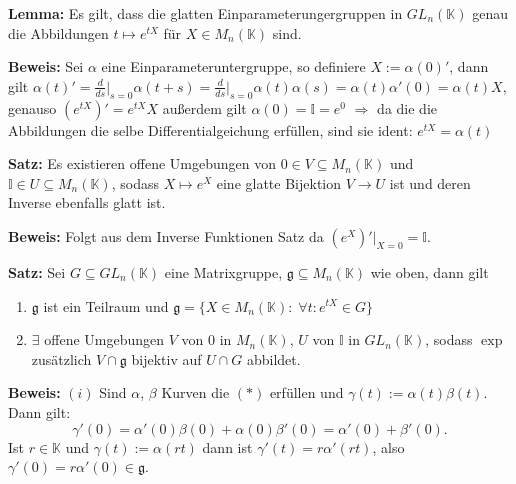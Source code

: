 \documentclass[11pt]{beamer}
\begin{document}
\begin{frame}
	\textbf{Lemma:}
	Es gilt, dass die glatten Einparameterungergruppen in $GL_n(\mathbb{K})$ genau die Abbildungen $t\mapsto e^{tX}$ für $X\in M_n(\mathbb{K})$ sind. \\[1em] \pause

	\textbf{Beweis:}
	Sei $\alpha$ eine Einparameteruntergruppe, so definiere $X:=\alpha(0)'$, \pause
	dann gilt $\alpha(t)' = \frac{d}{ds}\Big\vert_{s=0}\alpha(t+s) = \frac{d}{ds}\Big\vert_{s=0} \alpha(t)\alpha(s) = \alpha(t)\alpha'(0) = \alpha(t)X$,\pause
	 genauso $(e^{tX})' = e^{tX}X$ \pause
	außerdem gilt $\alpha(0) = \mathbb{I} = e^0$
	$\Rightarrow$ da die die Abbildungen die selbe Differentialgeichung erfüllen, sind sie ident: $e^{tX} = \alpha(t)$ \\[2em] \pause

	\textbf{Satz:}
	Es existieren offene Umgebungen von $0\in V \subseteq M_n(\mathbb{K})$ und $\mathbb{I}\in U\subseteq M_n(\mathbb{K})$, sodass $X\mapsto e^X$ eine glatte Bijektion $V\to U$ ist und deren Inverse ebenfalls glatt ist.\\[1em] \pause
	
	\textbf{Beweis:}
	Folgt aus dem Inverse Funktionen Satz da $(e^X)'\big\vert_{X=0} = \mathbb{I}$.
\end{frame}

\begin{frame}
	\textbf{Satz:}
	Sei $G\subseteq GL_n(\mathbb{K})$ eine Matrixgruppe, $\mathfrak{g}\subseteq M_n(\mathbb{K})$ wie oben, dann gilt \pause
	\begin{enumerate}[label = $(\roman*)$]
		\item $\mathfrak{g}$ ist ein Teilraum und $\mathfrak{g} = \{ X\in M_n(\mathbb{K}):\; \forall t:e^{tX}\in G \}$ \pause
		
		\item $\exists$ offene Umgebungen $V$ von 0 in $M_n(\mathbb{K})$, $U$ von $\mathbb{I}$ in $GL_n(\mathbb{K})$, sodass $\exp$ zusätzlich $V\cap \mathfrak{g}$ bijektiv auf $U\cap G$ abbildet. \pause
	\end{enumerate}
	
	\textbf{Beweis:} $(i)$ Sind $\alpha$, $\beta$ Kurven die $(*)$ erfüllen und
	$\gamma(t):= \alpha(t)\beta(t)$. Dann gilt: \pause
	\begin{equation*}
	\gamma'(0) = \alpha'(0)\beta(0) + \alpha(0)\beta'(0) = \alpha'(0)+\beta'(0).
	\end{equation*} \pause
	Ist $r\in \mathbb{K}$ und $\gamma(t) := \alpha(rt)$ dann ist
	$\gamma'(t) = r\alpha'(rt)$, also $\gamma'(0) = r\alpha'(0)\in \mathfrak{g}$. \\[0.5em]
\end{frame}
\end{document}
